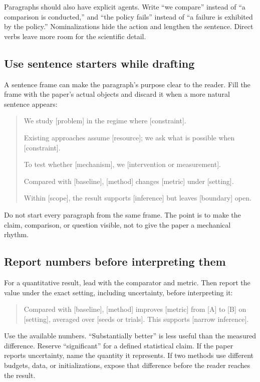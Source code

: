 Paragraphs should also have explicit agents. Write ``we compare'' instead of
``a comparison is conducted,'' and ``the policy fails'' instead of ``a failure
is exhibited by the policy.'' Nominalizations hide the action and lengthen the
sentence. Direct verbs leave more room for the scientific detail.

\subsection{Use sentence starters while drafting}

A sentence frame can make the paragraph's purpose clear to the reader. Fill
the frame with the paper's actual objects and discard it when a more natural
sentence appears:

\begin{quote}
We study [problem] in the regime where [constraint].

Existing approaches assume [resource]; we ask what is possible when
[constraint].

To test whether [mechanism], we [intervention or measurement].

Compared with [baseline], [method] changes [metric] under [setting].

Within [scope], the result supports [inference] but leaves [boundary] open.
\end{quote}

Do not start every paragraph from the same frame. The point is to make the
claim, comparison, or question visible, not to give the paper a mechanical
rhythm.

\subsection{Report numbers before interpreting them}

For a quantitative result, lead with the comparator and metric. Then report the
value under the exact setting, including uncertainty, before interpreting it:

\begin{quote}
Compared with [baseline], [method] improves [metric] from [A] to [B] on
[setting], averaged over [seeds or trials]. This supports [narrow inference].
\end{quote}

Use the available numbers. ``Substantially better'' is less useful than the
measured difference. Reserve ``significant'' for a defined statistical claim.
If the paper reports uncertainty, name the quantity it represents. If two
methods use different budgets, data, or initializations, expose that difference
before the reader reaches the result.

